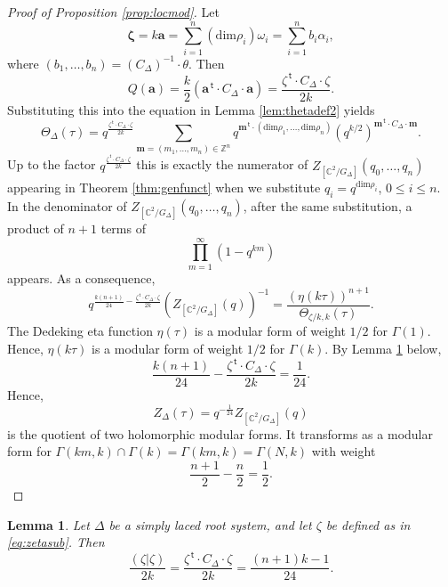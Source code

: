 \documentclass{article}
\newtheorem{lemma}[theorem]{Lemma}
\theoremstyle{definition}
\newcommand{\CC} {{\mathbb C}}          %
\newcommand{\ZZ} {{\mathbb Z}}		%
\renewcommand{\top}{\,\mathsf{t}}
\begin{document}
\begin{proof}[{Proof of Proposition \ref{prop:locmod}}]
Let
\begin{equation}\mathbf{\zeta}= k\mathbf{a}=\sum_{i=1}^n (\mathrm{dim} \rho_i) 
\omega_i=\sum_{i=1}^n b_i \alpha_i,
\label{eq:zetasub}
\end{equation}
where $(b_1,\dots,b_n)=(C_\Delta)^{-1} \cdot \theta$.
Then
\[ Q(\mathbf{a})=\frac{k}{2}\left(\mathbf{a}^ {\top} \cdot C_\Delta 
\cdot \mathbf{a}\right)=  \frac{\zeta^ {\top} \cdot C_\Delta \cdot \zeta}{2k}. \]
Substituting this into the equation in Lemma \ref{lem:thetadef2} yields
\begin{equation*} 
\Theta_{ \Delta }(\tau )= q^{\frac{\zeta^ {\top} \cdot C_\Delta \cdot \zeta}{2k}}
\sum_{ \mathbf{m}=(m_1,\dots,m_n) \in  \ZZ^n } q^{\mathbf{m}^ {\top} \cdot 
( \mathrm{dim} \rho_1 ,\dots, \mathrm{dim} \rho_n) } 
(q^{k/2})^{\mathbf{m}^ {\top} \cdot C_\Delta \cdot \mathbf{m}}
. 
\end{equation*}
Up to the factor $q^{ \frac{\zeta^ {\top} \cdot C_\Delta \cdot \zeta}{2k}}$ this is exactly 
the numerator of $Z_{[ \CC^2/G_\Delta]}(q_0,\dots,q_n)$ appearing in Theorem 
\ref{thm:genfunct} when we substitute $q_i=q^{\mathrm{dim} \rho_i}$, $0 \leq i \leq n$. In 
the denominator of $Z_{[ \CC^2/G_\Delta]}(q_0,\dots,q_n)$, after the same substitution, a 
product of $n+1$ terms of 
\[\prod_{m=1}^{\infty}(1-q^{km})\] 
appears. As a consequence,
\[ q^{\frac{k(n+1)}{24} - \frac{\zeta^ {\top} \cdot C_\Delta \cdot \zeta}{2k}}
(Z_{[ \CC^2/G_\Delta]}(q))^{-1}  = 
\frac{(\eta(k\tau))^{n+1}}{\Theta_{\zeta/k ,k}(\tau )}. \]
The Dedeking eta function $\eta(\tau)$ is a modular form of weight $1/2$ for $\Gamma(1)$. 
Hence, $\eta(k\tau)$ is a modular form of weight $1/2$ for $\Gamma(k)$.
By Lemma \ref{lem:betalength} below,
\[ \frac{k(n+1)}{24} - \frac{\zeta^ {\top} \cdot C_\Delta \cdot \zeta}{2k}=\frac{1}{24}. \]
Hence,
\[ Z_{\Delta}(\tau)=q^{-\frac{1}{24}}Z_{[ \CC^2/G_\Delta]}(q)
 \]
is the quotient of two holomorphic modular forms. It transforms as a modular form for 
$\Gamma(km,k)\cap \Gamma(k)=\Gamma(km,k)=\Gamma(N,k)$ with weight 
\[ \frac{n+1}{2}-\frac{n}{2}=\frac{1}{2}. \]
\end{proof}
\begin{lemma} Let $\Delta$ be a simply laced root system, and let $\zeta$ be 
defined as in \eqref{eq:zetasub}. Then
\[ \frac{(\zeta|\zeta)}{2k}=\frac{\zeta^ {\top} \cdot C_\Delta 
\cdot \zeta}{2k}=\frac{(n+1)k-1}{24}. \]
\label{lem:betalength}
\end{lemma}
\end{document}
